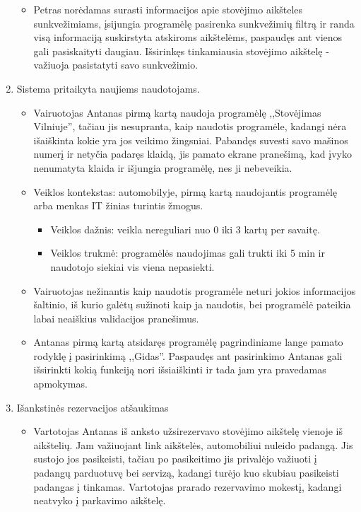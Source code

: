 \documentclass{VUMIFPSkursinis}
\begin{document}
\begin{enumerate}[label = \textbf{PV\arabic*.}]
\begin{itemize}[label={-}]
			\item Petras norėdamas surasti informacijos apie stovėjimo aikšteles sunkvežimiams, įsijungia programėlę pasirenka sunkvežimių filtrą ir randa visą informaciją suskirstyta atskiroms aikštelėms, paspaudęs ant vienos gali pasiskaityti daugiau. Išsirinkęs tinkamiausia stovėjimo aikštelę - važiuoja pasistatyti savo sunkvežimio.
			
		\end{itemize}
	\item Sistema pritaikyta naujiems naudotojams.
		\begin{itemize}[label={-}]
			\item Vairuotojas Antanas pirmą kartą naudoja programėlę ,,Stovėjimas Vilniuje'', tačiau jis nesupranta, kaip naudotis programėle, kadangi nėra išaiškinta kokie yra jos veikimo žingsniai. Pabandęs suvesti savo mašinos numerį ir netyčia padaręs klaidą, jis pamato ekrane pranešimą, kad įvyko nenumatyta klaida ir išjungia programėlę, nes ji nebeveikia.

			\item Veiklos kontekstas: automobilyje, pirmą kartą naudojantis programėlę arba menkas IT žinias turintis žmogus.
				\begin{itemize}[label={$\bullet$}]
					\item Veiklos dažnis: veikla nereguliari nuo 0 iki 3 kartų per savaitę.
					\item Veiklos trukmė: programėlės naudojimas gali trukti iki 5 min ir naudotojo siekiai vis viena nepasiekti.
				\end{itemize}
			\item Vairuotojas nežinantis kaip naudotis programėle neturi jokios informacijos šaltinio, iš kurio galėtų sužinoti kaip ja naudotis, bei programėlė pateikia labai neaiškius validacijos pranešimus. 

			\item Antanas pirmą kartą atsidaręs programėlę pagrindiniame lange pamato rodyklę į pasirinkimą ,,Gidas''. Paspaudęs ant pasirinkimo Antanas gali išsirinkti kokią funkciją nori išsiaiškinti ir tada jam yra pravedamas apmokymas.
			
		\end{itemize}
	\item Išankstinės rezervacijos atšaukimas
		\begin{itemize}[label={-}]
			\item Vartotojas Antanas iš anksto užsirezervavo stovėjimo aikštelę vienoje iš aikštelių. Jam važiuojant link aikštelės, automobiliui nuleido padangą. Jis sustojo jos pasikeisti, tačiau po pasikeitimo jis privalėjo važiuoti į padangų parduotuvę bei servizą, kadangi turėjo kuo skubiau pasikeisti padangas į tinkamas. Vartotojas prarado rezervavimo mokestį, kadangi neatvyko į parkavimo aikštelę.


\end{itemize}
\end{enumerate}
\end{document}
